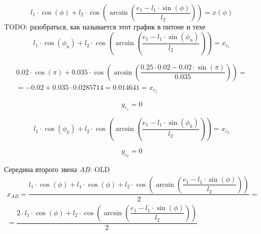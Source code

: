 \begin{equation}\label{eq:formul}
	l_1\cdot\cos(\phi)+l_2\cdot\cos\left(\arcsin\left(\dfrac{e_1-l_1\cdot\sin(\phi)}{l_2}\right)\right)=x(\phi)
\end{equation}
TODO: разобраться, как называется этот график в питоне и техе
\newpage
\begin{equation}\label{eq:xc1}
	l_1\cdot\cos(\phi_n)+l_2\cdot\cos\left(\arcsin\left(\dfrac{e_1-l_1\cdot\sin(\phi_n)}{l_2}\right)\right)=x_{c_1}
\end{equation}

\begin{multline}\label{eq:xc1calc}
	0.02\cdot\cos(\pi)+0.035\cdot\cos\left(\arcsin\left(\dfrac{0.25\cdot 0.02-0.02\cdot\sin(\pi)}{0.035}\right)\right)=\\
	=-0.02+0.035\cdot0.0285714=0.014641=x_{c_1}
\end{multline}

\begin{equation}\label{eq:yc1}
	y_{c_1} = 0
\end{equation}

\begin{equation}\label{eq:xc2}
	l_1\cdot\cos(\phi_k)+l_2\cdot\cos\left(\arcsin\left(\dfrac{e_1-l_1\cdot\sin(\phi_k)}{l_2}\right)\right)=x_{c_2}
\end{equation}

\begin{equation}\label{eq:yc2}
	y_{c_2}=0
\end{equation}

\newpage


\newpage
Середина второго звена $ AB $:
OLD
\begin{multline}\label{eq:xl2}
	x_{AB}=\dfrac{l_1\cdot\cos(\phi) + 	l_1\cdot\cos(\phi)+l_2\cdot\cos\left(\arcsin\left(\dfrac{e_1-l_1\cdot\sin(\phi)}{l_2}\right)\right)}{2}=\\
	=\dfrac{2\cdot l_1\cdot\cos(\phi)+l_2\cdot\cos\left(\arcsin\left(\dfrac{e_1-l_1\cdot\sin(\phi)}{l_2}\right)\right)}{2}
\end{multline}

